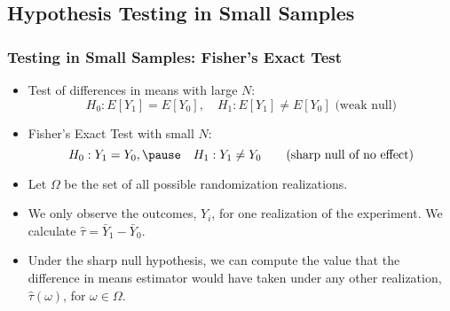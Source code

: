 \documentclass{beamer}
\numberwithin{equation}{section}
\begin{document}
\subsection{Hypothesis Testing in Small Samples}

\begin{frame}
  \frametitle{Testing in Small Samples: Fisher's Exact Test}
\begin{itemize}
\item Test of differences in means with large $N$:
\[
H_0:E[Y_1] =E[Y_0],\quad H_1:E[Y_1] \neq E[Y_0]  \mbox{  (weak null)}
\]\pause
\item Fisher's Exact Test with small $N$:
\[
H_0: Y_1 = Y_0,\pause\quad H_1: Y_1 \neq Y_0\qquad\mbox{(sharp null of no effect)}
\]\pause
\item Let $\Omega$ be the set of all possible randomization realizations.
\item We only observe the outcomes, $Y_i$, for one realization of the
experiment. We calculate $\hat\tau=\bar Y_1-\bar Y_0$.
\pause
\item Under the sharp null hypothesis, we can compute the value
that the difference in means estimator would have taken under any other
realization, $\hat\tau(\omega)$, for $\omega\in\Omega$.
\end{itemize}
\end{frame}
\end{document}
